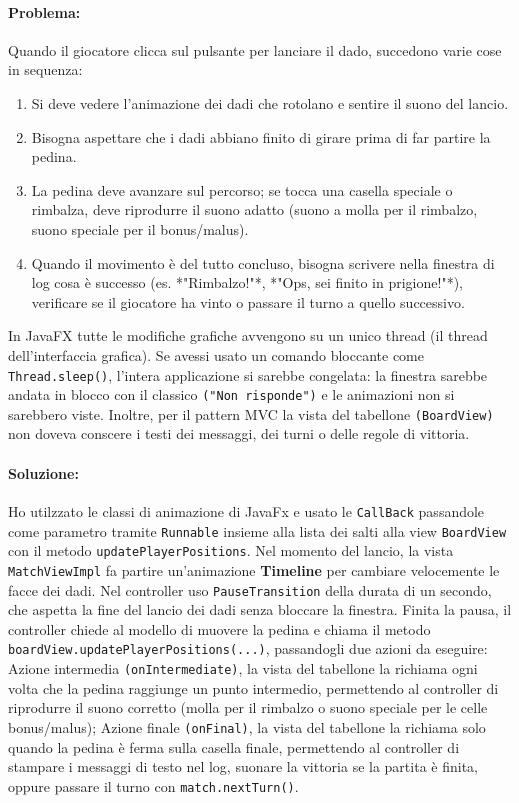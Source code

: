\documentclass[a4paper,12pt]{report}
\begin{document}
 \paragraph{Problema:}Quando il giocatore clicca sul pulsante per lanciare il dado, succedono varie cose in sequenza:
 \begin{enumerate}
     \item Si deve vedere l'animazione dei dadi che rotolano e sentire il suono del lancio.
     \item Bisogna aspettare che i dadi abbiano finito di girare prima di far partire la pedina.
     \item La pedina deve avanzare sul percorso; se tocca una casella speciale o rimbalza, deve riprodurre il suono adatto (suono a molla per il rimbalzo, suono speciale per il bonus/malus).
     \item Quando il movimento è del tutto concluso, bisogna scrivere nella finestra di log cosa è successo (es. *"Rimbalzo!"*, *"Ops, sei finito in prigione!"*), verificare se il giocatore ha vinto o passare il turno a quello successivo.
 \end{enumerate}
  In JavaFX tutte le modifiche grafiche avvengono su un unico thread (il thread dell'interfaccia grafica). Se avessi usato un comando bloccante come \texttt{Thread.sleep()}, l'intera applicazione si sarebbe congelata: la finestra sarebbe andata in blocco con il classico \texttt{("Non risponde")} e le animazioni non si sarebbero viste. Inoltre, per il pattern MVC la vista del tabellone \texttt{(BoardView)} non doveva conscere i testi dei messaggi, dei turni o delle regole di vittoria.
  \paragraph{Soluzione:}Ho utilzzato le classi di animazione di JavaFx e usato le \texttt{CallBack} passandole come parametro tramite \texttt{Runnable} insieme alla lista dei salti alla view \texttt{BoardView} con il metodo \texttt{updatePlayerPositions}.
  Nel momento del lancio, la vista \texttt{MatchViewImpl} fa partire un'animazione \textbf{Timeline} per cambiare velocemente le facce dei dadi.
  Nel controller uso \texttt{PauseTransition} della durata di un secondo, che aspetta la fine del lancio dei dadi senza bloccare la finestra. Finita la pausa, il controller chiede al modello di muovere la pedina e chiama il metodo \texttt{boardView.updatePlayerPositions(...)}, passandogli due azioni da eseguire:
    Azione intermedia \texttt{(onIntermediate)}, la vista del tabellone la richiama ogni volta che la pedina raggiunge un punto intermedio, permettendo al controller di riprodurre il suono corretto (molla per il rimbalzo o suono speciale per le celle bonus/malus);
    Azione finale \texttt{(onFinal)}, la vista del tabellone la richiama solo quando la pedina è ferma sulla casella finale, permettendo al controller di stampare i messaggi di testo nel log, suonare la vittoria se la partita è finita, oppure passare il turno con \texttt{match.nextTurn()}.
\end{document}
